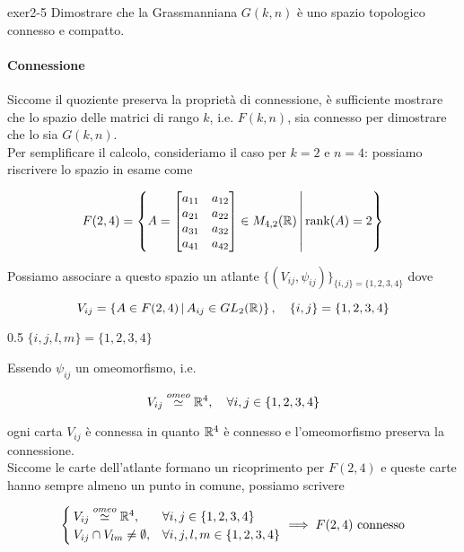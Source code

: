 {exer2-5}
{
Dimostrare che la Grassmanniana $ G(k,n) $ è uno spazio topologico connesso e compatto.
}
{
\paragraph{Connessione}

Siccome il quoziente preserva la proprietà di connessione, è sufficiente mostrare che lo spazio delle matrici di rango $ k $, i.e. $ F(k,n) $, sia connesso per dimostrare che lo sia $ G(k,n) $. \\
Per semplificare il calcolo, consideriamo il caso per $ k = 2 $ e $ n = 4 $: possiamo riscrivere lo spazio in esame come

\begin{equation}
	F(2,4) = \left\{ A = \bmqty{ a_{11} & a_{12} \\ a_{21} & a_{22} \\ a_{31} & a_{32} \\ a_{41} & a_{42} } \in M_{4,2}(\R) \st \rank(A) = 2 \right\}
\end{equation}

Possiamo associare a questo spazio un atlante $ \{(V_{ij},\psi_{ij})\}_{\{i,j\} = \{1,2,3,4\}} $ dove

\begin{equation}
	V_{ij} = \left\{ A \in F(2,4) \st A_{ij} \in GL_{2}(\R) \right\} %
	\qcomma \{i,j\} = \{1,2,3,4\}
\end{equation}

	{0.5}{%
			$ \{i,j,l,m\} = \{1,2,3,4\} $
			}

Essendo $ \psi_{ij} $ un omeomorfismo, i.e.

\begin{equation}
	V_{ij} \stackrel{omeo}{\simeq} \R^{4} \qcomma \forall i,j \in \{1,2,3,4\}
\end{equation}

ogni carta $ V_{ij} $ è connessa in quanto $ \mathbb{R}^{4} $ è connesso e l'omeomorfismo preserva la connessione. \\
Siccome le carte dell'atlante formano un ricoprimento per $ F(2,4) $ e queste carte hanno sempre almeno un punto in comune, possiamo scrivere

\begin{equation}
	\begin{cases}
		V_{ij} \stackrel{omeo}{\simeq} \R^{4}, & \forall i,j \in \{1,2,3,4\} \\
		V_{ij} \cap V_{lm} \neq \emptyset, & \forall i,j,l,m \in \{1,2,3,4\}
	\end{cases} %
	\implies %
	F(2,4) \text{ connesso}
\end{equation}

}
